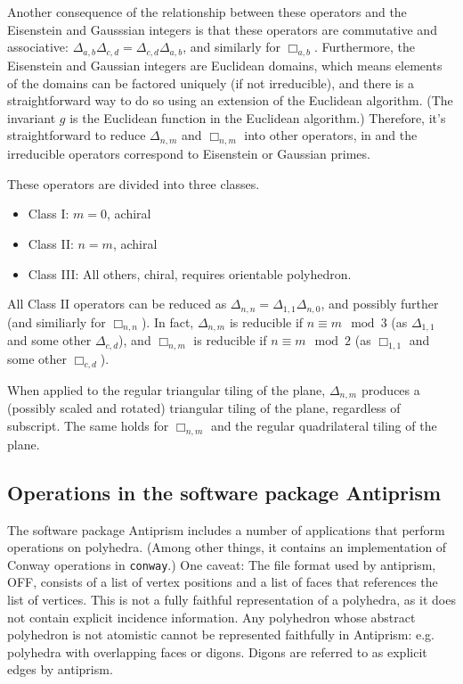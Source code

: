 \documentclass{amsart}[12pt]
\begin{document}
Another consequence of the relationship between these operators and the
Eisenstein and Gausssian integers is that these operators are commutative and
associative: $\Delta_{a,b}\Delta_{c,d} = \Delta_{c,d}\Delta_{a,b}$, and
similarly for $\Box_{a,b}$. Furthermore, the Eisenstein and Gaussian integers
are Euclidean domains, which means elements of the domains can be factored
uniquely (if not irreducible), and there is a straightforward way to do so
using an extension of the Euclidean algorithm. (The invariant $g$ is the
Euclidean function in the Euclidean algorithm.) Therefore, it's straightforward
to reduce $\Delta_{n,m}$ and $\Box_{n,m}$ into other operators, in
and the irreducible operators correspond to Eisenstein or Gaussian primes.

These operators are divided into three classes.
\begin{itemize}
  \item Class I: $m = 0$, achiral
  \item Class II: $n = m$, achiral
  \item Class III: All others, chiral, requires orientable polyhedron.
\end{itemize}
All Class II operators can be reduced as
$\Delta_{n,n} = \Delta_{1,1}\Delta_{n,0}$, and possibly further (and similiarly
for $\Box_{n,n}$). In fact, $\Delta_{n,m}$ is reducible if $n \equiv m \mod 3$
(as $\Delta_{1,1}$ and some other $\Delta_{c,d}$), and $\Box_{n,m}$ is
reducible if $n \equiv m \mod 2$ (as $\Box_{1,1}$ and some other $\Box_{c,d}$).

When applied to the regular triangular tiling of the plane, $\Delta_{n,m}$
produces a (possibly scaled and rotated) triangular tiling of the plane,
regardless of subscript. The same holds for $\Box_{n,m}$ and the regular
quadrilateral tiling of the plane.

\subsection{Operations in the software package Antiprism}

The software package Antiprism \cite{antiprism} includes a number of
applications that perform operations on polyhedra. (Among other things, it
contains an implementation of Conway operations in \texttt{conway}.) One
caveat: The file format used by antiprism, OFF, consists of a list of vertex
positions and a list of faces that references the list of vertices. This is
not a fully faithful representation of a polyhedra, as it does not contain
explicit incidence information. Any polyhedron whose abstract polyhedron is
not atomistic cannot be represented faithfully in Antiprism: e.g. polyhedra
with overlapping faces or digons. Digons are referred to as explicit edges by
antiprism.
\end{document}
